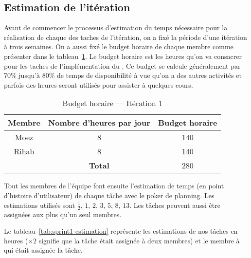\subsection{Estimation de l'itération}

Avant de commencer le processus d'estimation du temps nécessaire pour la
réalisation de chaque des taches de l'itération, on a fixé la période d'une
itération à trois semaines. On a aussi fixé le budget horaire de chaque membre
comme présenter dans le tableau~\ref{tab:sprint1-capacity}. Le budget horaire
est les heures qu'on va consacrer pour les taches de l'implémentation du
. Ce budget se calcule généralement par 70\% jusqu'à 80\%
de temps de disponibilité à  vue qu'on a des autres
activités et parfois des heures seront utilisés pour assister à quelques cours.

\begin{table}[htbp]
    \centering
    \begin{tabular}{| c | c | c |}
        \hline
        \textbf{Membre} & \textbf{Nombre d'heures par jour} & \textbf{Budget horaire} \\ \hline
        \hline

Moez & 8 & 140\\ \hline
Rihab & 8 & 140 \\ \hline
\multicolumn{1}{c|}{} & \textbf{Total} & 280 \\ \cline{2-3}
    \end{tabular}
    \caption{Budget horaire --- Itération 1}
\label{tab:sprint1-capacity}
\end{table}

Tout les membres de l'équipe font ensuite l'estimation de temps (en point
d'histoire d'utilisateur) de chaque tâche avec le poker de planning. Les
estimations utilisés sont $\frac{1}{2}$, $1$, $2$, $3$, $5$, $8$, $13$. Les
tâches peuvent aussi être assignées aux plus qu'un seul membres.

Le tableau~\ref{tab:sprint1-estimation} représente les estimations de nos
tâches en heures ($\times2$ signifie que la tâche était assignée à deux membres)
et le membre à qui était assignée la tâche.

